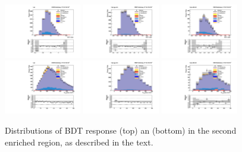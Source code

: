 \begin{figure}[!htpb]\centering
 \includegraphics[width=0.30\textwidth]{plots_and_figures/chapter6/tt_cr_cutbased/1_preselection_BDT_value.pdf}
 \includegraphics[width=0.30\textwidth]{plots_and_figures/chapter6/tt_cr_cutbased/21_preselection_BDT_value.pdf} 
 \includegraphics[width=0.30\textwidth]{plots_and_figures/chapter6/tt_cr_cutbased/22_preselection_BDT_value.pdf} \\
 \includegraphics[width=0.30\textwidth]{plots_and_figures/chapter6/tt_cr_cutbased/1_preselection_h_collmass_pfmet.pdf}
 \includegraphics[width=0.30\textwidth]{plots_and_figures/chapter6/tt_cr_cutbased/21_preselection_h_collmass_pfmet.pdf} 
 \includegraphics[width=0.30\textwidth]{plots_and_figures/chapter6/tt_cr_cutbased/22_preselection_h_collmass_pfmet.pdf} \\


 \caption{Distributions of BDT response (top) an \mcol (bottom) in the second \ttb enriched region, as described in the text.}
 \label{fig:tt_cr_cutbased}
\end{figure}

